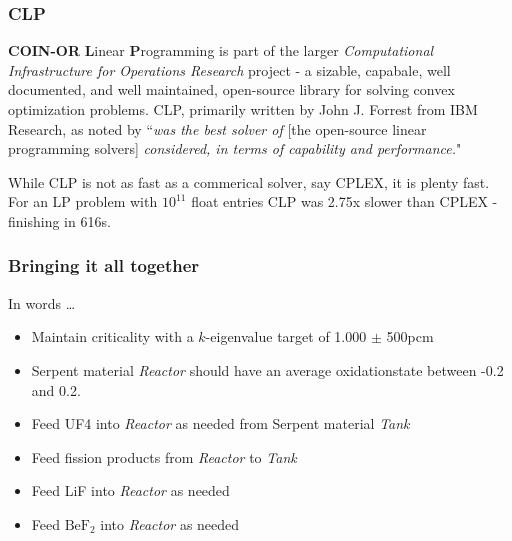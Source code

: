\documentclass{beamer}
\begin{document}
\begin{frame}
\frametitle{CLP}

    \textbf{COIN-OR} \textbf{L}inear \textbf{P}rogramming is part of the larger
    \textit{Computational Infrastructure for Operations Research} project
    - a sizable, capabale, well documented, and well maintained, open-source
     library for solving convex optimization problems. CLP, primarily written
     by John J. Forrest from IBM Research, as noted by 
     \cite{gearhart_comparison_2013} ``\textit{was the best solver of} [the open-source linear programming solvers] \textit{considered, in terms of
     capability and performance.}"

     \par

     While CLP is not as fast as a commerical solver, say CPLEX, it is plenty
     fast. For an LP problem with $10^{11}$ float entries CLP was 2.75x slower
     than CPLEX - finishing in 616s. 

\end{frame}

\begin{frame}
\frametitle{Bringing it all together}

    In words \ldots

    \begin{itemize}
        \item Maintain criticality with a $k$-eigenvalue target of 1.000 $\pm$ 500pcm
        \item Serpent material \textit{Reactor} should have an average oxidationstate between -0.2 and 0.2.
        \item Feed UF4 into \textit{Reactor} as needed from Serpent material \textit{Tank}
        \item Feed fission products from \textit{Reactor} to \textit{Tank}
        \item Feed LiF into \textit{Reactor} as needed
        \item Feed $\textrm{BeF}_{2}$ into \textit{Reactor} as needed
    \end{itemize}

\end{frame}
\end{document}
